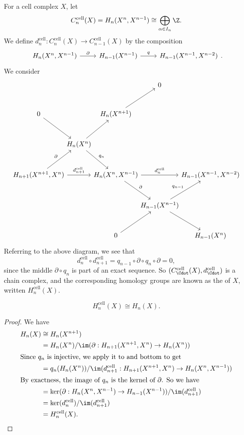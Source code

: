 \documentclass[a4paper]{article}
\theoremstyle{definition}
\begin{document}
For a cell complex $X$, let
\[
  C_n^{\mathrm{cell}}(X) = H_n(X^n, X^{n - 1}) \cong \bigoplus_{\alpha \in I_n} \Z.
\]
We define $d_n^{\mathrm{cell}}: C_n^{\mathrm{cell}}(X) \to C_{n - 1}^{\mathrm{cell}}(X)$ by the composition
\[
  \begin{tikzcd}
    H_n(X^n, X^{n - 1}) \ar[r, "\partial"] & H_{n - 1}(X^{n - 1}) \ar[r, "q"] & H_{n - 1}(X^{n - 1}, X^{n - 2})
  \end{tikzcd}.
\]
We consider
\[
  \begin{tikzcd}[row sep=large, column sep=-0.5em]
    &&& 0\\
    0 \ar[dr] && H_n(X^{n + 1}) \ar[ur]\\
    &H_n(X^n) \ar[ur] \ar[dr, "q_n"]\\
    H_{n + 1}(X^{n + 1}, X^n) \ar[ur, "\partial"] \ar[rr, "d_{n + 1}^{\mathrm{cell}}"] & & H_n(X^n, X^{n - 1}) \ar[rr, "d_n^{\mathrm{cell}}"] \ar[rd, "\partial"] && H_{n - 1}(X^{n - 1}, X^{n - 2})\\
    & & & H_{n - 1}(X^{n - 1}) \ar[rd] \ar[ru, "q_{n - 1}"]\\
    & & 0 \ar[ur] & & H_{n - 1}(X^n)
  \end{tikzcd}
\]
Referring to the above diagram, we see that
\[
  d_n^{\mathrm{cell}} \circ d_{n + 1}^{\mathrm{cell}} = q_{n - 1} \circ \partial \circ q_n \circ \partial = 0,
\]
since the middle $\partial \circ q_n$ is part of an exact sequence. So $(C_{\Cdot}^{\mathrm{cell}}(X), d_{\Cdot}^{\mathrm{cell}})$ is a chain complex, and the corresponding homology groups are known as the  of $X$, written $H_n^{\mathrm{cell}}(X)$.

\begin{thm}
  \[
    H_n^{\mathrm{cell}}(X) \cong H_n(X).
  \]
\end{thm}

\begin{proof}
  We have
  \begin{align*}
    H_n(X) &\cong H_n(X^{n + 1}) \\
    &= H_n(X^n)/\im(\partial: H_{n + 1}(X^{n + 1}, X^n) \to H_n(X^n))\\
    \intertext{Since $q_n$ is injective, we apply it to and bottom to get}
    &= q_n(H_n(X^n)) / \im(d_{n + 1}^{\mathrm{cell}}: H_{n + 1}(X^{n + 1}, X^n) \to H_n(X^n, X^{n - 1}))\\
    \intertext{By exactness, the image of $q_n$ is the kernel of $\partial$. So we have}
    &= \ker(\partial: H_n(X^n, X^{n - 1}) \to H_{n - 1}(X^{n - 1})) / \im(d_{n + 1}^{\mathrm{cell}})\\
    &= \ker(d_n^{\mathrm{cell}}) / \im(d_{n + 1}^{\mathrm{cell}})\\
    &= H_n^{\mathrm{cell}}(X).
  \end{align*}
\end{proof}
\end{document}

